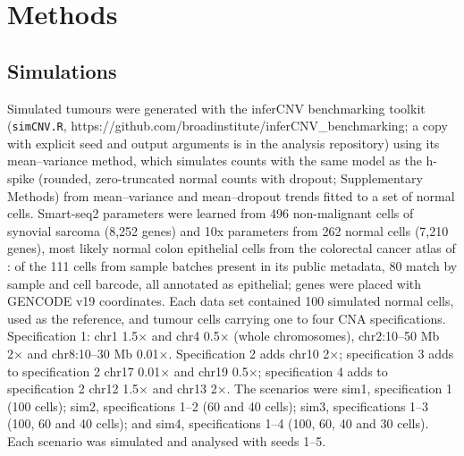 \section{Methods}\label{sec:methods}

\subsection{Simulations}

Simulated tumours were generated with the inferCNV benchmarking toolkit (\texttt{simCNV.R}, https://github.com/broadinstitute/inferCNV\_benchmarking; a copy with explicit seed and output arguments is in the analysis repository) using its mean--variance method, which simulates counts with the same model as the h-spike (rounded, zero-truncated normal counts with dropout; Supplementary Methods) from mean--variance and mean--dropout trends fitted to a set of normal cells. Smart-seq2 parameters were learned from 496 non-malignant cells of synovial sarcoma \citep{jerbyarnon2021} (8,252 genes) and 10x parameters from 262 normal cells (7,210 genes), most likely normal colon epithelial cells from the colorectal cancer atlas of \citet{pelka2021}: of the 111 cells from sample batches present in its public metadata, 80 match by sample and cell barcode, all annotated as epithelial; genes were placed with GENCODE v19 coordinates. Each data set contained 100 simulated normal cells, used as the reference, and tumour cells carrying one to four CNA specifications. Specification 1: chr1 1.5× and chr4 0.5× (whole chromosomes), chr2:10--50 Mb 2× and chr8:10--30 Mb 0.01×. Specification 2 adds chr10 2×; specification 3 adds to specification 2 chr17 0.01× and chr19 0.5×; specification 4 adds to specification 2 chr12 1.5× and chr13 2×. The scenarios were sim1, specification 1 (100 cells); sim2, specifications 1--2 (60 and 40 cells); sim3, specifications 1--3 (100, 60 and 40 cells); and sim4, specifications 1--4 (100, 60, 40 and 30 cells). Each scenario was simulated and analysed with seeds 1--5.

